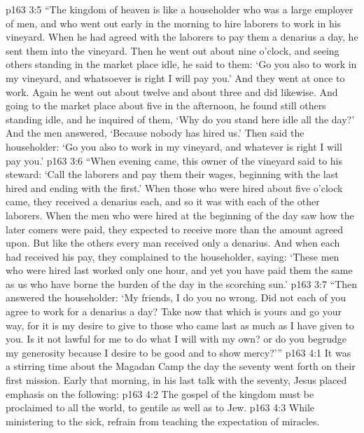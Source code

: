 \vs p163 3:5 \textcolor{ubdarkred}{“The kingdom of heaven is like a householder who was a large employer of men, and who went out early in the morning to hire laborers to work in his vineyard. When he had agreed with the laborers to pay them a denarius a day, he sent them into the vineyard. Then he went out about nine o’clock, and seeing others standing in the market place idle, he said to them: ‘Go you also to work in my vineyard, and whatsoever is right I will pay you.’ And they went at once to work. Again he went out about twelve and about three and did likewise. And going to the market place about five in the afternoon, he found still others standing idle, and he inquired of them, ‘Why do you stand here idle all the day?’ And the men answered, ‘Because nobody has hired us.’ Then said the householder: ‘Go you also to work in my vineyard, and whatever is right I will pay you.’}
\vs p163 3:6 \textcolor{ubdarkred}{“When evening came, this owner of the vineyard said to his steward: ‘Call the laborers and pay them their wages, beginning with the last hired and ending with the first.’ When those who were hired about five o’clock came, they received a denarius each, and so it was with each of the other laborers. When the men who were hired at the beginning of the day saw how the later comers were paid, they expected to receive more than the amount agreed upon. But like the others every man received only a denarius. And when each had received his pay, they complained to the householder, saying: ‘These men who were hired last worked only one hour, and yet you have paid them the same as us who have borne the burden of the day in the scorching sun.’}
\vs p163 3:7 \textcolor{ubdarkred}{“Then answered the householder: ‘My friends, I do you no wrong. Did not each of you agree to work for a denarius a day? Take now that which is yours and go your way, for it is my desire to give to those who came last as much as I have given to you. Is it not lawful for me to do what I will with my own? or do you begrudge my generosity because I desire to be good and to show mercy?’”}
\vs p163 4:1 It was a stirring time about the Magadan Camp the day the seventy went forth on their first mission. Early that morning, in his last talk with the seventy, Jesus placed emphasis on the following:
\pc \vs p163 4:2 \bibnobreakspace The gospel of the kingdom must be proclaimed to all the world, to gentile as well as to Jew.
\pc \vs p163 4:3 \bibnobreakspace While ministering to the sick, refrain from teaching the expectation of miracles.
